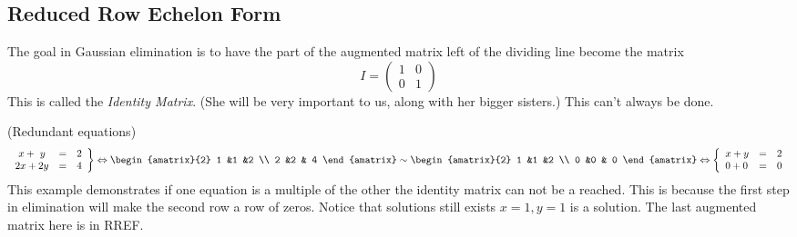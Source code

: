 \subsection{Reduced Row Echelon Form}
The goal in Gaussian elimination is to have the part of the augmented matrix left of the dividing line become the matrix
 $$I=    \begin{pmatrix}
      1             &0  \\
      0             &1
    \end{pmatrix}$$ 
This is called the \emph{Identity Matrix}.  
(She will be very important to us, along with her bigger sisters.)
%
This can't always be done.

\begin{example} (Redundant equations)
 \begin{eqnarray*}
   \left.
\begin{array}{lcr}
	\ x + \ y & = & 2 \\
	2x + 2y & = &  4
     \end{array}
   \right\} 
   \Leftrightarrow
\begin{amatrix}{2}
1 &1 &2 \\ 2 &2 & 4
\end{amatrix}
\sim
\begin{amatrix}{2}
1 &1 &2 \\ 0 &0 & 0
\end{amatrix}
\Leftrightarrow
\left\{
\begin{array}{lcr}
	x + y & = & 2 \\
	 0 + 0 & = &  0
     \end{array}
   \right.
\end{eqnarray*}  
This example demonstrates if one equation is a multiple of the other the identity matrix can not be a reached. This is because the first step in elimination will make the second row a row of zeros. Notice that solutions still exists $x=1,y=1$ is a solution. The last augmented matrix here is in RREF.
\end{example}

